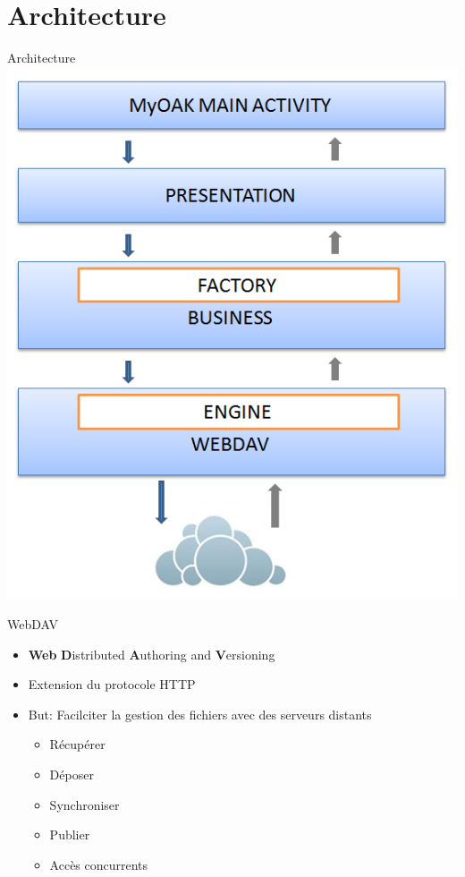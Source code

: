 \section{Architecture}
\begin{frame}{Architecture}
	\hspace{2.5cm} \includegraphics[scale=0.42]{img/Archi}
\end{frame}

\begin{frame}{WebDAV}
	\begin{itemize}
	\item \textbf{Web} \textbf{D}istributed \textbf{A}uthoring and \textbf{V}ersioning
	\item Extension du protocole HTTP
	\item But: Facilciter la gestion des fichiers avec des serveurs distants
		\begin{itemize}
		\item Récupérer
		\item Déposer
		\item Synchroniser
		\item Publier
		\item Accès concurrents
		\end{itemize}
	\end{itemize}
\end{frame}
		
